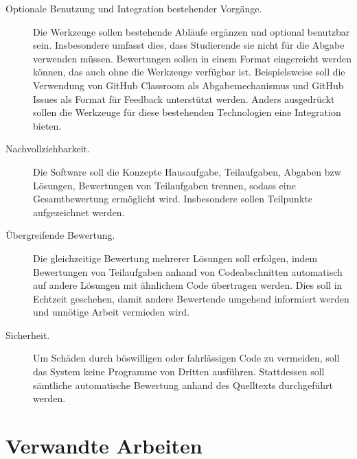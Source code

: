 \begin{description}
    \item[Optionale Benutzung und Integration bestehender Vorgänge.]
    Die Werkzeuge sollen bestehende Abläufe ergänzen und optional benutzbar sein.
    Insbesondere umfasst dies, dass Studierende sie nicht für die Abgabe verwenden müssen.
    Bewertungen sollen in einem Format eingereicht werden können, das auch ohne die Werkzeuge verfügbar ist.
    Beispielsweise soll die Verwendung von GitHub Classroom als Abgabemechanismus und GitHub Issues als Format für Feedback unterstützt werden.
    Anders ausgedrückt sollen die Werkzeuge für diese bestehenden Technologien eine Integration bieten.
    \item[Nachvollziehbarkeit.]
    Die Software soll die Konzepte Hausaufgabe, Teilaufgaben, Abgaben \ac{bzw} Lösungen, Bewertungen von Teilaufgaben trennen, sodass eine Gesamtbewertung ermöglicht wird.
    Insbesondere sollen Teilpunkte aufgezeichnet werden.
    \item[Übergreifende Bewertung.]
    Die gleichzeitige Bewertung mehrerer Lösungen soll erfolgen, indem Bewertungen von Teilaufgaben anhand von Codeabschnitten automatisch auf andere Lösungen mit ähnlichem Code übertragen werden.
    Dies soll in Echtzeit geschehen, damit andere Bewertende umgehend informiert werden und unnötige Arbeit vermieden wird.
    \item[Sicherheit.]
    Um Schäden durch böswilligen oder fahrlässigen Code zu vermeiden, soll das System keine Programme von Dritten ausführen.
    Stattdessen soll sämtliche automatische Bewertung anhand des Quelltexts durchgeführt werden.
\end{description}

\section{Verwandte Arbeiten}\label{sec:related-work}



